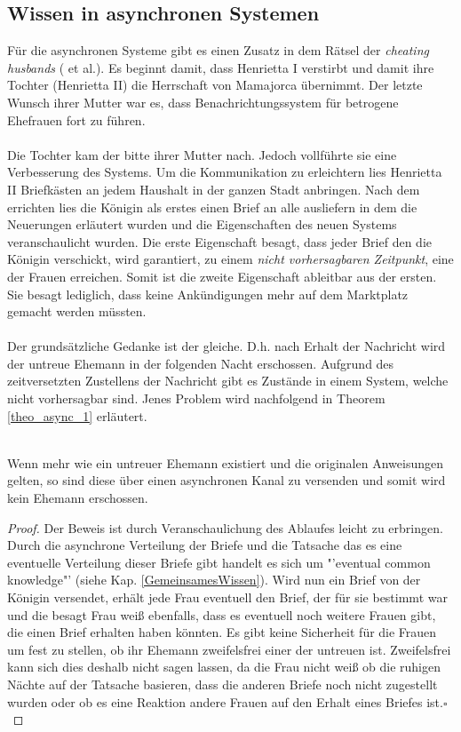 \subsection{Wissen in asynchronen Systemen}
\label{wissen_sync}
Für die asynchronen Systeme gibt es einen Zusatz in dem Rätsel der \textit{cheating husbands} (\cite{moses1986cheating} et al.). Es beginnt damit, dass Henrietta I verstirbt und damit ihre Tochter (Henrietta II) die Herrschaft von Mamajorca übernimmt. Der letzte Wunsch ihrer Mutter war es, dass Benachrichtungssystem für betrogene Ehefrauen fort zu führen. \\\\
Die Tochter kam der bitte ihrer Mutter nach. Jedoch vollführte sie eine Verbesserung des Systems. Um die Kommunikation zu erleichtern lies Henrietta II Briefkästen an jedem Haushalt in der ganzen Stadt anbringen. Nach dem errichten lies die Königin als erstes einen Brief an alle ausliefern in dem die Neuerungen erläutert wurden und die Eigenschaften des neuen Systems veranschaulicht wurden. Die erste Eigenschaft besagt, dass jeder Brief den die Königin verschickt, wird garantiert, zu einem \textit{nicht vorhersagbaren Zeitpunkt}, eine der Frauen erreichen. Somit ist die zweite Eigenschaft ableitbar aus der ersten. Sie besagt lediglich, dass keine Ankündigungen mehr auf dem Marktplatz gemacht werden müssten.\\\\
Der grundsätzliche Gedanke ist der gleiche. D.h. nach Erhalt der Nachricht wird der untreue Ehemann in der folgenden Nacht erschossen. Aufgrund des zeitversetzten Zustellens der Nachricht gibt es Zustände in einem System, welche nicht vorhersagbar sind. Jenes Problem wird nachfolgend in Theorem \ref{theo_async_1} erläutert.
\begin{theorem}\\
\label{theo_async_1}
Wenn mehr wie ein untreuer Ehemann existiert und die originalen Anweisungen gelten, so sind diese über einen asynchronen Kanal zu versenden und somit wird kein Ehemann erschossen.
\end{theorem}
\begin{proof}
Der Beweis ist durch Veranschaulichung des Ablaufes leicht zu erbringen. Durch die asynchrone Verteilung der Briefe und die Tatsache das es eine eventuelle Verteilung dieser Briefe gibt handelt es sich um "'eventual common knowledge"' (siehe Kap. \ref{GemeinsamesWissen}). Wird nun ein Brief von der Königin versendet, erhält jede Frau eventuell den Brief, der für sie bestimmt war und die besagt Frau weiß ebenfalls, dass es eventuell noch weitere Frauen gibt, die einen Brief erhalten haben könnten. Es gibt keine Sicherheit für die Frauen um fest zu stellen, ob ihr Ehemann zweifelsfrei einer der untreuen ist. Zweifelsfrei kann sich dies deshalb nicht sagen lassen, da die Frau nicht weiß ob die ruhigen Nächte auf der Tatsache basieren, dass die anderen Briefe noch nicht zugestellt wurden oder ob es eine Reaktion andere Frauen auf den Erhalt eines Briefes ist.$\square$
\end{proof}
